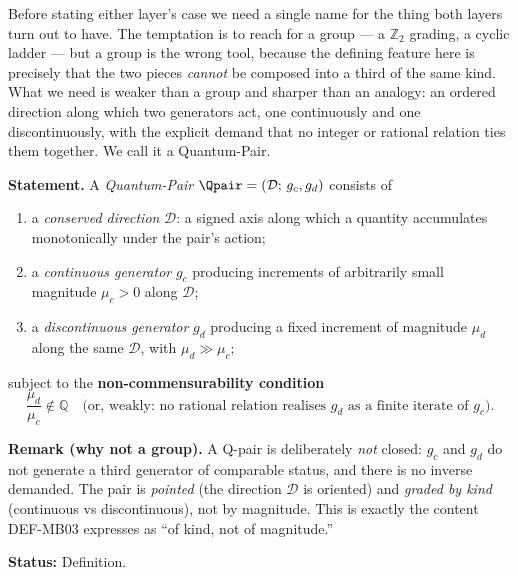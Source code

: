 \documentclass[12pt, a4paper]{article}
\begin{document}
Before stating either layer's case we need a single name for the thing
both layers turn out to have. The temptation is to reach for a group ---
a $\mathbb{Z}_2$ grading, a cyclic ladder --- but a group is the wrong tool,
because the defining feature here is precisely that the two pieces
\emph{cannot} be composed into a third of the same kind. What we need is
weaker than a group and sharper than an analogy: an ordered direction
along which two generators act, one continuously and one discontinuously,
with the explicit demand that no integer or rational relation ties them
together. We call it a Quantum-Pair.

\begin{formalbox}[title={DEF-ZC90-01: Quantum-Pair (Q-pair) ($R_0$, Definition)}]

\textbf{Statement.}
A \emph{Quantum-Pair} $\Qpair=(\mathcal{D};\,g_c,g_d)$ consists of
\begin{enumerate}[leftmargin=2em, noitemsep]
  \item a \emph{conserved direction} $\mathcal{D}$: a signed axis along
    which a quantity accumulates monotonically under the pair's action;
  \item a \emph{continuous generator} $g_c$ producing increments of
    arbitrarily small magnitude $\mu_c>0$ along $\mathcal{D}$;
  \item a \emph{discontinuous generator} $g_d$ producing a fixed increment
    of magnitude $\mu_d$ along the same $\mathcal{D}$, with $\mu_d\gg\mu_c$;
\end{enumerate}
subject to the \textbf{non-commensurability condition}
\begin{equation}
  \boxed{\;\frac{\mu_d}{\mu_c}\notin\mathbb{Q}\quad\text{(or, weakly:
  no rational relation realises $g_d$ as a finite iterate of $g_c$).}\;}
  \label{eq:qpair-zc90}
\end{equation}

\textbf{Remark (why not a group).} A Q-pair is deliberately \emph{not}
closed: $g_c$ and $g_d$ do not generate a third generator of comparable
status, and there is no inverse demanded. The pair is \emph{pointed} (the
direction $\mathcal{D}$ is oriented) and \emph{graded by kind}
(continuous vs discontinuous), not by magnitude. This is exactly the
content DEF-MB03 expresses as ``of kind, not of magnitude.''

\textbf{Status:} Definition.
\end{formalbox}
\end{document}

